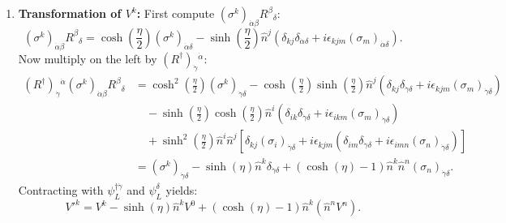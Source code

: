 \documentclass[11pt,a4paper]{article}
\begin{document}
\begin{enumerate}
    \item \textbf{Transformation of $V^k$:}
    First compute $(\sigma^k)_{\dot{\alpha}\beta}R^\beta{}_\delta$:
    \begin{equation}
        (\sigma^k)_{\dot{\alpha}\beta}R^\beta{}_\delta = \cosh\left(\frac{\eta}{2}\right)(\sigma^k)_{\dot{\alpha}\delta} - \sinh\left(\frac{\eta}{2}\right)\hat{n}^j\left(\delta_{kj}\delta_{\dot{\alpha}\delta} + i\epsilon_{kjm}(\sigma_m)_{\dot{\alpha}\delta}\right).
    \end{equation}
    Now multiply on the left by $(R^\dagger)_{\dot{\gamma}}{}^{\dot{\alpha}}$:
    \begin{align}
        (R^\dagger)_{\dot{\gamma}}{}^{\dot{\alpha}}(\sigma^k)_{\dot{\alpha}\beta}R^\beta{}_\delta &= \cosh^2\left(\frac{\eta}{2}\right)(\sigma^k)_{\dot{\gamma}\delta} - \cosh\left(\frac{\eta}{2}\right)\sinh\left(\frac{\eta}{2}\right)\hat{n}^j\left(\delta_{kj}\delta_{\dot{\gamma}\delta} + i\epsilon_{kjm}(\sigma_m)_{\dot{\gamma}\delta}\right) \nonumber \\
        &\quad - \sinh\left(\frac{\eta}{2}\right)\cosh\left(\frac{\eta}{2}\right)\hat{n}^i\left(\delta_{ik}\delta_{\dot{\gamma}\delta} + i\epsilon_{ikm}(\sigma_m)_{\dot{\gamma}\delta}\right) \nonumber \\
        &\quad + \sinh^2\left(\frac{\eta}{2}\right)\hat{n}^i\hat{n}^j\left[\delta_{kj}(\sigma_i)_{\dot{\gamma}\delta} + i\epsilon_{kjm}\left(\delta_{im}\delta_{\dot{\gamma}\delta} + i\epsilon_{imn}(\sigma_n)_{\dot{\gamma}\delta}\right)\right] \nonumber \\
        &= (\sigma^k)_{\dot{\gamma}\delta} - \sinh(\eta)\hat{n}^k \delta_{\dot{\gamma}\delta} + (\cosh(\eta) - 1)\hat{n}^k \hat{n}^n (\sigma_n)_{\dot{\gamma}\delta}.
    \end{align}
    Contracting with $\psi_L^{\dagger\dot{\gamma}}$ and $\psi_L^\delta$ yields:
    \begin{equation}
        V'^k = V^k - \sinh(\eta)\hat{n}^k V^0 + (\cosh(\eta) - 1)\hat{n}^k (\hat{n}^n V^n).
    \end{equation}
\end{enumerate}
\end{document}
